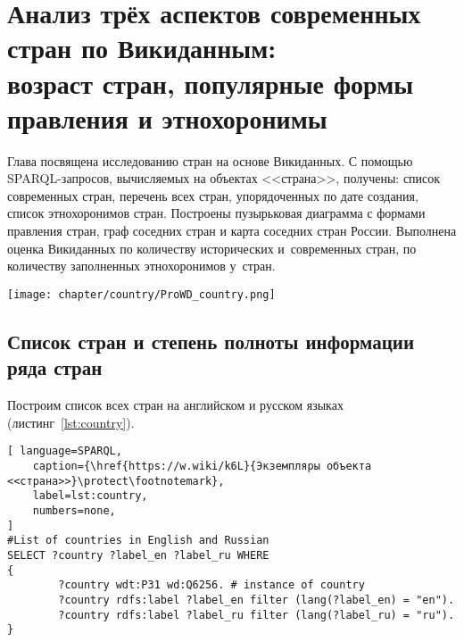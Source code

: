 \chapter[Анализ стран: возраст, формы правления и этнохоронимы]{Анализ трёх аспектов современных стран по Викиданным:\\возраст стран, популярные формы правления и этнохоронимы}
\label{ch:country}

Глава посвящена исследованию стран на основе Викиданных. 
С помощью SPARQL-запросов, вычисляемых на объектах <<страна>>, получены: 
список современных стран, перечень всех стран, упорядоченных по дате создания, 
список этнохоронимов стран. 
Построены пузырьковая диаграмма с формами правления стран, 
граф соседних стран и карта соседних стран России. 
Выполнена оценка Викиданных по количеству исторических и~современных стран, 
по количеству заполненных этнохоронимов у~стран. 


\begin{marginfigure}[7\baselineskip]
    \texttt{[image: chapter/country/ProWD\_country.png]}
    \caption[Степень заполненности свойств стран на Викиданных]%
	{%
    Высокая степень заполнения по числу свойств объекта Викиданных \href{https://www.wikidata.org/wiki/Q6256}{страна (Q6256)}. 
    Данные получены с помощью сервиса \href{https://prowd.id/dashboards/86b6f91a8131/profile}{ProWD.id}, 2020 год.\\ 
    Коэффициент Джини равен \num{0.091}
	}%
	\label{fig:ProWD_country}%
\end{marginfigure}


\section{Список стран и степень полноты информации ряда стран}

Построим список всех стран на английском и русском языках (листинг~\ref{lst:country}).

\begin{lstlisting}[ language=SPARQL, 
    caption={\href{https://w.wiki/k6L}{Экземпляры объекта <<страна>>}\protect\footnotemark},
    label=lst:country, 
    numbers=none,
]
#List of countries in English and Russian
SELECT ?country ?label_en ?label_ru WHERE
{
		?country wdt:P31 wd:Q6256. # instance of country
		?country rdfs:label ?label_en filter (lang(?label_en) = "en").
		?country rdfs:label ?label_ru filter (lang(?label_ru) = "ru").
}
\end{lstlisting}

